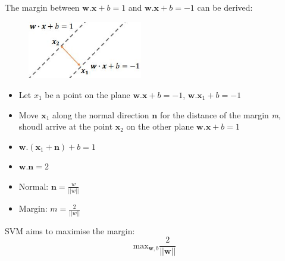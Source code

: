 \documentclass{report}
\begin{document}
The margin between $\textbf{w}.\textbf{x} + b = 1$ and $\textbf{w}.\textbf{x} +
b = -1$ can be derived:
\begin{figure}[h]
    \centering
    \includegraphics[width=5cm]{Maximu margin.JPG}
\end{figure}
\begin{itemize}
    \item Let $x_1$ be a point on the plane $\textbf{w}.\textbf{x} + b = -1$,
    $\textbf{w}.\textbf{x}_1 + b = -1$
    \item Move $\textbf{x}_1$ along the normal direction $\textbf{n}$ for the
    distance of the margin \textit{m}, shoudl arrive at the point $\textbf{x}_2$
    on the other plane $\textbf{w}.\textbf{x} + b = 1$
    \item $\textbf{w}.(\textbf{x}_1 + \mathbf{n}) + b = 1$
    \item $\mathbf{w}.\textbf{n} = 2$
    \item Normal: $\textbf{n} = \frac{w}{||w||}$
    \item Margin: $m = \frac{2}{||w||}$
\end{itemize}

SVM aims to maximise the margin: 
$$
    \text{max}_{\textbf{w},b} \frac{2}{||\textbf{w}||}
$$
\end{document}
